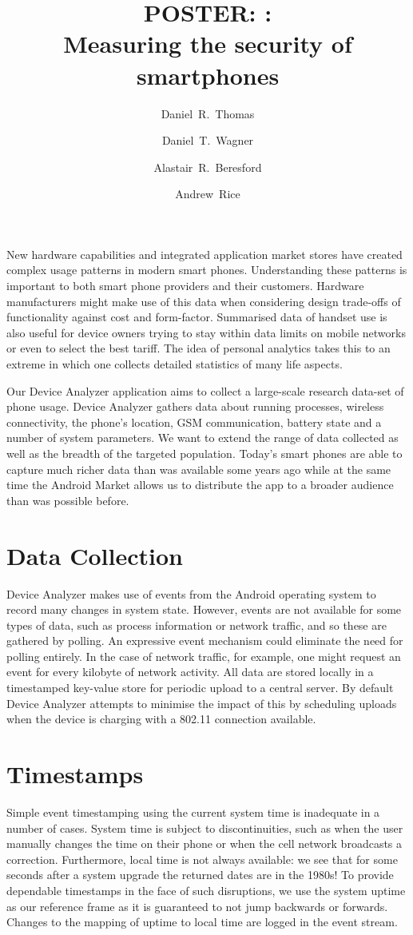 \documentclass{sig-alternate}
\author{Daniel~R.~Thomas \and Daniel~T.~Wagner \and Alastair~R.~Beresford \and Andrew~Rice\\       \email{Firstname.Lastname@cl.cam.ac.uk}
}
\title{POSTER: \da :\\Measuring the security of smartphones}
\begin{document}
\maketitle

New hardware capabilities and integrated application market stores have created complex usage patterns in modern smart phones.
Understanding these patterns is important to both smart phone providers and their customers.
Hardware manufacturers might make use of this data when considering design trade-offs of functionality against cost and form-factor.
Summarised data of handset use is also useful for device owners trying to stay within data limits on mobile networks or even to select the best tariff.
The idea of personal analytics takes this to an extreme in which one collects detailed statistics of many life aspects.

Our Device Analyzer application aims to collect a large-scale research data-set of phone usage.
Device Analyzer gathers data about running processes, wireless connectivity, the phone’s location, GSM communication, battery state and a number of system parameters.
We want to extend the range of data collected as well as the breadth of the targeted population.
Today’s smart phones are able to capture much richer data than was available some years ago while at the same time the Android Market allows us to distribute the app to a broader audience than was possible before.

\section{Data Collection}
Device Analyzer makes use of events from the Android operating system to record many changes in system state.
However, events are not available for some types of data, such as process information or network traffic, and so these are gathered by polling.
An expressive event mechanism could eliminate the need for polling entirely.
In the case of network traffic, for example, one might request an event for every kilobyte of network activity.
All data are stored locally in a timestamped key-value store for periodic upload to a central server.
By default Device Analyzer attempts to minimise the impact of this by scheduling uploads when the device is charging with a 802.11 connection available.

\section{Timestamps}
Simple event timestamping using the current system time is inadequate in a number of cases.
System time is subject to discontinuities, such as when the user manually changes the time on their phone or when the cell network broadcasts a correction.
Furthermore, local time is not always available: we see that for some seconds after a system upgrade the returned dates are in the 1980s!
To provide dependable timestamps in the face of such disruptions, we use the system uptime as our reference frame as it is guaranteed to not jump backwards or forwards.
Changes to the mapping of uptime to local time are logged in the event stream.
\end{document}
